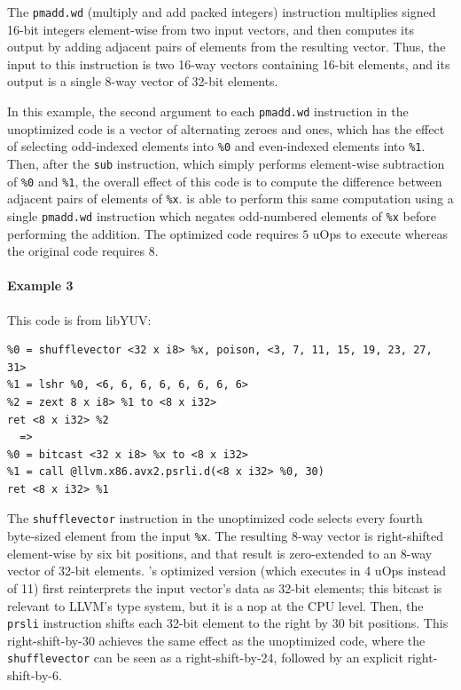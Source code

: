 The \texttt{pmadd.wd} (multiply and add packed integers) instruction multiplies
signed 16-bit integers element-wise from two input vectors, and then
computes its output by adding adjacent pairs of elements from the
resulting vector.
%
Thus, the input to this instruction is two 16-way vectors containing
16-bit elements, and its output is a single 8-way vector of 32-bit
elements.


In this example, the second argument to each \texttt{pmadd.wd}
instruction in the unoptimized code is a vector of alternating zeroes
and ones, which has the effect of selecting odd-indexed elements into
\texttt{\%0} and even-indexed elements into \texttt{\%1}.
%
Then, after the \texttt{sub} instruction, which simply performs
element-wise subtraction of \texttt{\%0} and \texttt{\%1}, the overall
effect of this code is to compute the difference between adjacent
pairs of elements of \texttt{\%x}.
%
\minotaur{} is able to perform this same computation using a single
\texttt{pmadd.wd} instruction which negates odd-numbered elements of
\texttt{\%x} before performing the addition.
%
The optimized code requires $5$ uOps to execute whereas the original
code requires $8$.


\paragraph*{Example 3}

This code is from libYUV:

{\begin{quoting}\begin{Verbatim}
%0 = shufflevector <32 x i8> %x, poison, <3, 7, 11, 15, 19, 23, 27, 31>
%1 = lshr %0, <6, 6, 6, 6, 6, 6, 6, 6>
%2 = zext 8 x i8> %1 to <8 x i32>
ret <8 x i32> %2
  =>
%0 = bitcast <32 x i8> %x to <8 x i32>
%1 = call @llvm.x86.avx2.psrli.d(<8 x i32> %0, 30)
ret <8 x i32> %1
\end{Verbatim}
\end{quoting}}

The \texttt{shufflevector} instruction in the unoptimized code selects
every fourth byte-sized element from the input \texttt{\%x}.
%
The resulting 8-way vector is right-shifted element-wise by six bit
positions, and that result is zero-extended to an 8-way vector of
32-bit elements.
%
\minotaur's optimized version (which executes in 4 uOps instead of 11)
first reinterprets the input vector's data as 32-bit elements; this
bitcast is relevant to LLVM's type system, but it is a nop at the CPU
level.
%
Then, the \texttt{prsli} instruction shifts each 32-bit element to the
right by 30 bit positions.
%
This right-shift-by-30 achieves the same effect as the unoptimized
code, where the \texttt{shufflevector} can be seen as a
right-shift-by-24, followed by an explicit right-shift-by-6.

